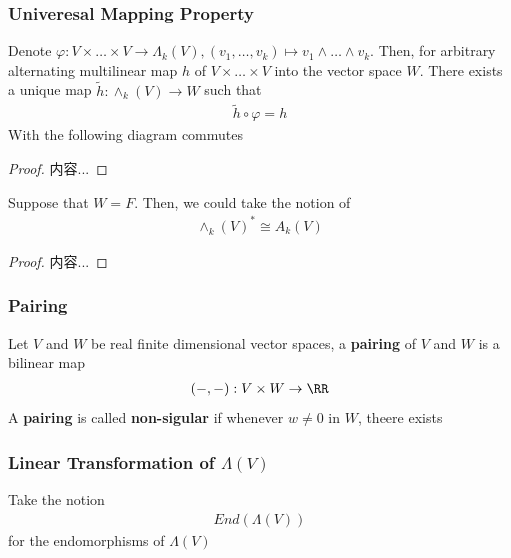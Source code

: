 \documentclass[Total.tex]{subfiles}
\begin{document}
					\subsubsection{Univeresal Mapping Property}
						\begin{proposition}
							Denote $\varphi:V\times \dots\times V\rightarrow \Lambda_k(V),(v_1,\dots,v_k)\mapsto v_1\wedge\dots\wedge v_k$. Then, for arbitrary alternating multilinear map $h$ of $V\times \dots\times V$ into the vector space $W$. There exists a unique map $\tilde{h}:\wedge_k(V)\rightarrow W$ such that
							\begin{gather*}
								\tilde{h}\circ \varphi=h
							\end{gather*}
							With the following diagram commutes
							\begin{center}
							\end{center}
						\end{proposition}
						\begin{proof}
							内容...
						\end{proof}
						
						\begin{corollary}
							Suppose that $W=F$. Then, we could take the notion of
							\begin{gather*}
								\wedge_k(V)^*\cong A_k(V)
							\end{gather*}
						\end{corollary}
						\begin{proof}
							内容...
						\end{proof}
					\subsubsection{Pairing}
						\begin{Def}
							Let $V$ and $W$ be real finite dimensional vector spaces, a \textbf{pairing} of $V$ and $W$ is a bilinear map
							\begin{gather*}
								(-,-):V\times W\rightarrow \RR
							\end{gather*}
							A \textbf{pairing} is called \textbf{non-sigular} if whenever $w\not=0$ in $W$, theere exists 
						\end{Def}
					\subsubsection{Linear Transformation of $\Lambda(V)$}
						Take the notion
						\begin{gather*}
							End(\Lambda(V))
						\end{gather*}
						for the endomorphisms of $\Lambda(V)$
\end{document}
